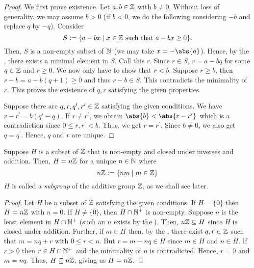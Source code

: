 \begin{proof}
    We first prove existence. Let $a,b \in \mathbb{Z}$ with $b \neq 0$. Without loss of generality, we may assume $b > 0$ (if $b < 0$, we do the following considering $-b$ and replace $q$ by $-q$). Consider
    \[
        S \vcentcolon= \{ a - bx \mid x \in \mathbb{Z} \text{ such that } a - bx \geq 0 \}.
    \]
    Then, $S$ is a non-empty subset of $\mathbb{N}$ (we may take $x = -\abs{a}$). Hence, by the , there exists a minimal element in $S$. Call this $r$. Since $r \in S$, $r = a - bq$ for some $q \in \mathbb{Z}$ and $r \geq 0$. We now only have to show that $r < b$. Suppose $r \geq b$, then $r - b = a - b(q+1) \geq 0$ and thus $r-b \in S$. This contradicts the minimality of $r$. This proves the existence of $q,r$ satisfying the given properties.
    
    \medskip
    
    Suppose there are $q,r,q^{\prime}, r^{\prime} \in \mathbb{Z}$ satisfying the given conditions. We have $r - r^{\prime} = b(q{\prime} - q)$. If $r \neq r^{\prime}$, we obtain $\abs{b} < \abs{r - r^{\prime}}$ which is a contradiction since $0 \leq r, r^{\prime} < b$. Thus, we get $r = r^{\prime}$. Since $b \neq 0$, we also get $q = q^{\prime}$. Hence, $q$ and $r$ are unique.
\end{proof}

\begin{cor} \label{cor:additive_subgroup_nZ}
    Suppose $H$ is a subset of $\mathbb{Z}$ that is non-empty and closed under inverses and addition. Then, $H = n\mathbb{Z}$ for a unique $n \in \mathbb{N}$ where
    \[
        n\mathbb{Z} \vcentcolon= \left\{ nm \mid m \in \mathbb{Z} \right\}
    \]
    $H$ is called a \emph{subgroup} of the additive group $\mathbb{Z}$, as we shall see later.
\end{cor}
\begin{proof}
    Let $H$ be a subset of $\mathbb{Z}$ satisfying the given conditions. If $H = \{0\}$ then $H = n\mathbb{Z}$ with $n=0$. If $H \neq \{0\}$, then $H \cap \mathbb{N}^+$ is non-empty. Suppose $n$ is the least element in $H \cap \mathbb{N}^+$ (such an $n$ exists by the ). Then, $n\mathbb{Z} \subseteq H$ since $H$ is closed under addition. Further, if $m \in H$ then, by the , there exist $q,r \in \mathbb{Z}$ such that $m = nq + r$ with $0 \leq r < n$. But $r = m - nq \in H$ since $m \in H$ and $n \in H$. If $r > 0$ then $r \in H \cap \mathbb{N}^+$ and the minimality of $n$ is contradicted. Hence, $r = 0$ and $m = nq$. Thus, $H \subseteq n\mathbb{Z}$, giving us $H = n\mathbb{Z}$.
\end{proof}

